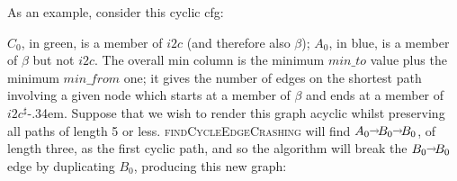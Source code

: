 \noindent
As an example, consider this cyclic \gls{cfg}:
\vfill
\centerline{
}
\vfill
\noindent $C_0$, in green, is a member of $i2c$ (and therefore also
$\beta$); $A_0$, in blue, is a member of $\beta$ but not $i2c$.  The
overall min column is the minimum $\mathit{min\_to}$ value plus the
minimum $\mathit{min\_from}$ one; it gives the number of edges on the
shortest path involving a given node which starts at a member of
$\beta$ and ends at a member of $i2c^\sharp$\kern-.34em.  Suppose that we wish to
render this graph acyclic whilst preserving all paths of length 5 or
less.  \textsc{findCycleEdgeCrashing} will find $A_0 \shortrightarrow B_0
\shortrightarrow B_0$, of length three, as the first cyclic path, and so
the algorithm will break the $B_0 \shortrightarrow B_0$ edge by
duplicating $B_0$, producing this new graph:
\vfill
